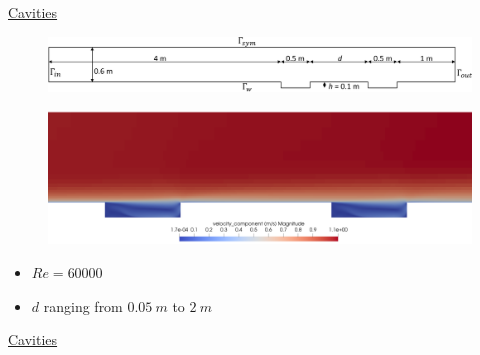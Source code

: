 \documentclass{beamer}
\begin{document}
\begin{frame}[label=cavities]{\hyperlink{cavitiesSupp}{Cavities}}
\begin{figure}
	\centering
	\includegraphics[width=\textwidth]{cavities_domain.pdf}
\end{figure}
\begin{figure}
	\centering
	\includegraphics[width=\textwidth, trim={0 0 0 6cm}, 
	clip]{cavities_dist1_vel.png}
\end{figure}
\begin{itemize}
	\item $Re = 60000$
	\item $d$ ranging from $\SI{0.05}{m}$ to $\SI{2}{m}$
\end{itemize}
\end{frame}
\begin{frame}{\hyperlink{cavitiesSupp}{Cavities}}
\begin{figure}
	\centering
	\subfloat[\scriptsize $u$ profile at $y=h$, 
	$d=\SI{1}{m}$]{\hspace{-0.5cm}}
\end{figure}
\end{frame}
\end{document}
